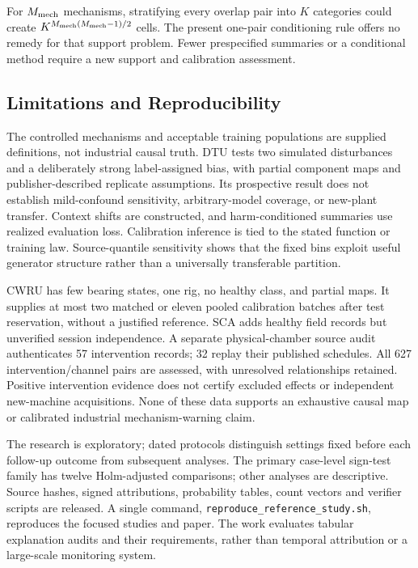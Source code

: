 \documentclass[conference]{IEEEtran}
\begin{document}
For $M_{\rm mech}$ mechanisms, stratifying every overlap pair into $K$ categories could create $K^{M_{\rm mech}(M_{\rm mech}-1)/2}$ cells. The present one-pair conditioning rule offers no remedy for that support problem. Fewer prespecified summaries or a conditional method require a new support and calibration assessment.

\subsection{Limitations and Reproducibility}
The controlled mechanisms and acceptable training populations are supplied definitions, not industrial causal truth. DTU tests two simulated disturbances and a deliberately strong label-assigned bias, with partial component maps and publisher-described replicate assumptions. Its prospective result does not establish mild-confound sensitivity, arbitrary-model coverage, or new-plant transfer. Context shifts are constructed, and harm-conditioned summaries use realized evaluation loss. Calibration inference is tied to the stated function or training law. Source-quantile sensitivity shows that the fixed bins exploit useful generator structure rather than a universally transferable partition.

CWRU has few bearing states, one rig, no healthy class, and partial maps. It supplies at most two matched or eleven pooled calibration batches after test reservation, without a justified reference. SCA adds healthy field records but unverified session independence. A separate physical-chamber source audit authenticates 57 intervention records; 32 replay their published schedules. All 627 intervention/channel pairs are assessed, with unresolved relationships retained. Positive intervention evidence does not certify excluded effects or independent new-machine acquisitions. None of these data supports an exhaustive causal map or calibrated industrial mechanism-warning claim.

The research is exploratory; dated protocols distinguish settings fixed before each follow-up outcome from subsequent analyses. The primary case-level sign-test family has twelve Holm-adjusted comparisons; other analyses are descriptive. Source hashes, signed attributions, probability tables, count vectors and verifier scripts are released. A single command, \texttt{reproduce\_reference\_study.sh}, reproduces the focused studies and paper. The work evaluates tabular explanation audits and their requirements, rather than temporal attribution or a large-scale monitoring system.
\end{document}
